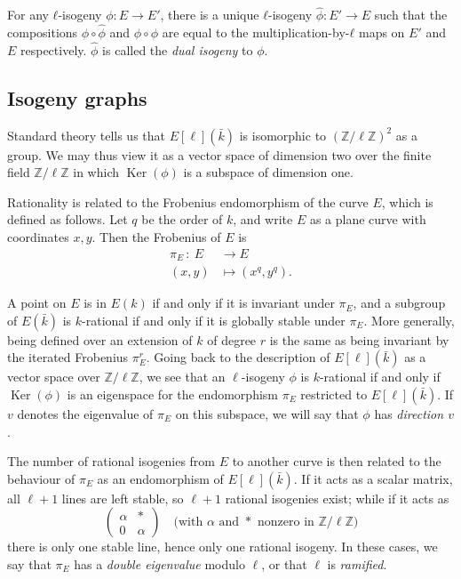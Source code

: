 \documentclass{article}
\newcommand{\Z}{\mathbb{Z}}
\newcommand{\from}{\ensuremath{\,:\ }}
\theoremstyle{definition}
\DeclareMathOperator{\Ker}{Ker}
\begin{document}
For any $ℓ$-isogeny $ϕ:E→E'$, there is a unique $ℓ$-isogeny
$\hat{ϕ}:E'→E$ such that the compositions $ϕ∘\hat{ϕ}$ and $\hat{ϕ}∘ϕ$
are equal to the multiplication-by-$ℓ$ maps on $E'$ and $E$
respectively. $\hat{ϕ}$ is called the \emph{dual isogeny} to $ϕ$.


\subsection{Isogeny graphs}


Standard theory tells us that $E[\ell](\bar{k})$ is isomorphic to $(\Z/\ell\Z)^2$
as a group. We may thus view it as a vector space of dimension two over the 
finite field $\Z/\ell\Z$ in which $\Ker(\phi)$ is a subspace of dimension one.

Rationality is related to the Frobenius endomorphism of the curve $E$, which is 
defined as follows. Let $q$ be the order of $k$, and write $E$ as a plane curve 
with coordinates $x, y$. Then the Frobenius of $E$ is
\[
\begin{aligned}
\pi_E \from E &\to E \\
 (x, y) &\mapsto (x^q, y^q).
\end{aligned}
\]

A point on $E$ is in $E(k)$ if and only if it is invariant under $\pi_E$, 
and a subgroup of $E(\bar{k})$ is $k$-rational if and only if it is globally 
stable under $\pi_E$. More generally, being defined over an extension of $k$
of degree $r$ is the same as being invariant by the iterated Frobenius $\pi_E^r$.
Going back to the description of $E[\ell](\bar{k})$ as a 
vector space over $\Z/\ell\Z$, we see that an $\ell$-isogeny $\phi$ is 
$k$-rational if and only if $\Ker(\phi)$ is an eigenspace for the 
endomorphism $\pi_E$ restricted to $E[\ell](\bar{k})$. If $v$ denotes the 
eigenvalue of $\pi_E$ on this subspace, we will say that $\phi$ has \emph{
direction $v$}.


The number of rational isogenies from $E$ to another curve is then related to 
the behaviour of $\pi_E$ as an endomorphism of $E[\ell](\bar{k})$. If it acts 
as a scalar matrix, all $\ell+1$ lines are left stable, so $\ell+1$ rational 
isogenies exist; while if it acts as
\[
\left(
\begin{matrix}
\alpha & * \\
0 & \alpha
\end{matrix}
\right)
\quad
\text{(with $\alpha$ and $*$ nonzero in $\Z/\ell\Z$)}
\]
there is only one stable line, hence only one rational isogeny. In these cases, 
we say that $\pi_E$ has a \emph{double eigenvalue} modulo $\ell$, or that $\ell$
 is \emph{ramified}.
\end{document}
